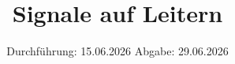 


\subject{v52}
\title{Signale auf Leitern}
\date{%
  Durchführung: 15.06.2026
  \hspace{3em}
  Abgabe: 29.06.2026
}



\maketitle
\thispagestyle{empty}
\tableofcontents
\newpage








\printbibliography{}




